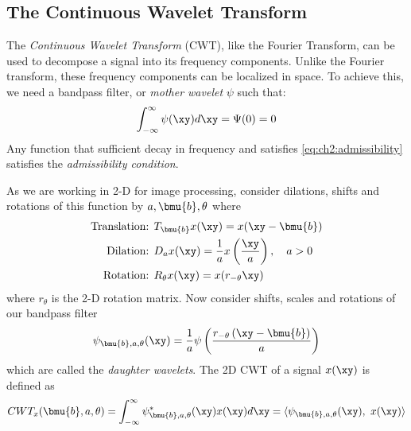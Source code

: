 
\subsection{The Continuous Wavelet Transform}
The \emph{Continuous Wavelet Transform} (CWT), like the Fourier Transform, can be used
to decompose a signal into its frequency components. Unlike the Fourier
transform, these frequency components can be localized in space. To
achieve this, we need a bandpass filter, or \emph{mother wavelet} $\psi$ such that:
\begin{equation}
  \int_{-\infty}^{\infty} \psi(\xy) d\xy = \Psi(0) = 0\label{eq:ch2:admissibility}
\end{equation}
Any function that sufficient decay in frequency and satisfies
\eqref{eq:ch2:admissibility} satisfies the \emph{admissibility condition}.

As we are working in 2-D for image processing, consider dilations, shifts and
rotations of this function by $a, \bmu{b}, \theta$ where 
\begin{align}
  \text{Translation: } & T_{\bmu{b}}x(\xy) = x(\xy - \bmu{b}) \label{eq:ch2:tr} \\
  \text{Dilation: } & D_{a}x(\xy) = \frac{1}{a} x\left(\frac{\xy}{a}\right), \quad a>0 \label{eq:ch2:di}\\
  \text{Rotation: } & R_{\theta}x(\xy) = x(r_{-\theta}\xy) \label{eq:ch2:rot}
\end{align}
where $r_\theta$ is the 2-D rotation matrix. Now consider shifts, scales and
rotations of our bandpass filter 
\begin{equation}
  \psi_{\bmu{b},a, \theta}(\xy) = \frac{1}{a}\psi \left(\frac{r_{-\theta}\left(\xy -
  \bmu{b}\right)}{a} \right) \label{eq:ch2:2d_shifts}
\end{equation}
which are called the \emph{daughter wavelets}. The 2D CWT of a signal $x(\xy)$ is defined as
\begin{equation}
  CWT_x(\bmu{b}, a, \theta) = \int_{-\infty}^{\infty} \psi^*_{\bmu{b}, a,
  \theta}(\xy) x(\xy) d\xy = \langle \psi_{\bmu{b}, a, \theta}(\xy),\ x(\xy)
  \rangle \label{eq:ch2:cwt}
\end{equation}

